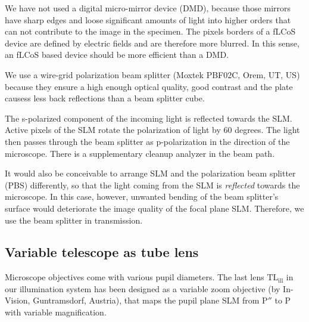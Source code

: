 We have not used a digital micro-mirror device (DMD), because those
mirrors have sharp edges and loose significant amounts of light into
higher orders that can not contribute to the image in the
specimen. The pixels borders of a fLCoS device are defined by electric
fields and are therefore more blurred. In this sense, an fLCoS based
device should be more efficient than a DMD.

We use a wire-grid polarization beam splitter (Moxtek PBF02C,     
Orem, UT, US) because they ensure a high enough optical quality, good
contrast and the plate causess less back reflections than a beam
splitter cube.



The s-polarized component of the incoming light is reflected towards
the SLM. Active pixels of the SLM rotate the polarization of light by
60 degrees. The light then passes through the beam splitter as
p-polarization in the direction of the microscope. There is a
supplementary cleanup analyzer in the beam path.

It would also be conceivable to arrange SLM and the polarization beam splitter (PBS)
differently, so that the light coming from the SLM is \emph{reflected}
towards the microscope. In this case, however, unwanted bending of the
beam splitter's surface would deteriorate the image quality of the
focal plane SLM. Therefore, we use the beam splitter in transmission.



 	
	  	

\subsection{ Variable telescope as tube lens}
Microscope objectives come with various pupil diameters. The last lens
$\textrm{TL}_\textrm{ill}$ in our illumination system has been
designed as a variable zoom objective (by In-Vision, Guntramsdorf,
Austria), that maps the pupil plane SLM from $\textrm{P}''$ to
$\textrm{P}$ with variable magnification.

